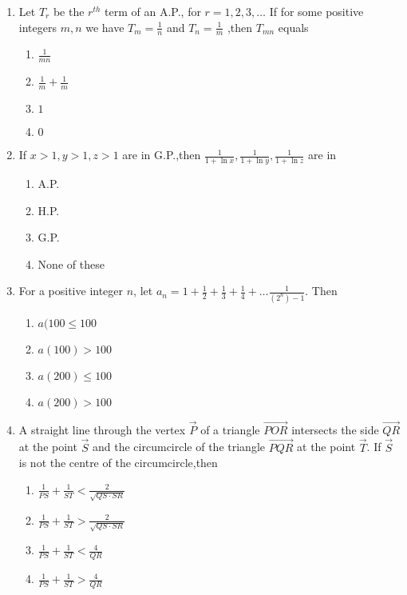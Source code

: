 \documentclass[journal]{IEEEtran}
\theoremstyle{remark}
\begin{document}
\begin{enumerate}
\item Let $T_r$ be the $r^{th}$ term of an A.P., for $r=1,2,3,\dots$ If for some positive integers $m,n$ we have
$T_m=\frac{1}{n}$ and $T_n=\frac{1}{m}$ ,then $T_{mn}$ equals \hfill{}

\begin{multicols}{4}
\begin{enumerate}
\item $\frac{1}{mn}$
\item $\frac{1}{m} + \frac{1}{m}$
\item $1$
\item $0$
\end{enumerate}
\end{multicols}

\item If $x>1,y>1,z>1$ are in G.P.,then $\frac{1}{1+\ln x},\frac{1}{1+\ln y},\frac{1}{1+\ln z}$ are in 
\hfill{}
\begin{multicols}{4}
\begin{enumerate}
\item A.P.
\item H.P.
\item G.P.
\item None of these
\end{enumerate}
\end{multicols}

\item For a positive integer $n$, let
$a_n=1+\frac{1}{2}+\frac{1}{3}+\frac{1}{4}+\dots\frac{1}{(2^n)-1}$. Then \hfill{}
\begin{multicols}{4}
\begin{enumerate}
\item $a(100\leq 100$
\item $a(100) > 100$
\item $a(200)\leq 100$
\item $a(200) > 100$
\end{enumerate}
\end{multicols}

\item A straight line through the vertex $\vec{P}$ of a triangle $\vec{POR}$ intersects the side $\vec{QR}$ at the point $\vec{S}$ and the circumcircle of the triangle $\vec{PQR}$ at the point $\vec{T}$. If $\vec{S}$ is not the centre of the circumcircle,then  \hfill{}
\begin{multicols}{2}
\begin{enumerate}
\item $\frac{1}{PS}+\frac{1}{ST}<\frac{2}{\sqrt{QS \cdot SR}}$
\item $\frac{1}{PS}+\frac{1}{ST}>\frac{2}{\sqrt{QS \cdot SR}}$
\item $\frac{1}{PS}+\frac{1}{ST}<\frac{4}{QR}$
\item $\frac{1}{PS}+\frac{1}{ST}>\frac{4}{QR}$
\end{enumerate}
\end{multicols}


\end{enumerate}
\end{document}
